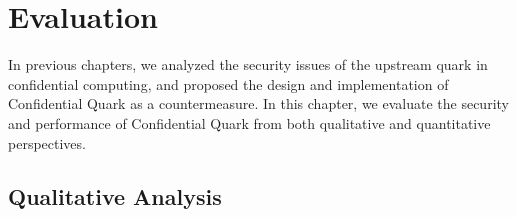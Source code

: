 \chapter{Evaluation}
\label{sec:evaluation}

In previous chapters, we analyzed the security issues of the upstream quark in confidential computing, and proposed the design and implementation of Confidential Quark as a countermeasure. 
In this chapter, we evaluate the security and performance of Confidential Quark from both qualitative and quantitative perspectives.


\section{Qualitative Analysis}


